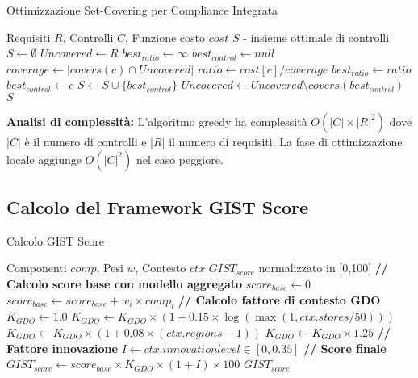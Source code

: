 \begin{algorithm}
\caption{Ottimizzazione Set-Covering per Compliance Integrata}
\label{alg:compliance}
\begin{algorithmic}
\Require Requisiti $R$, Controlli $C$, Funzione costo $cost$
\Ensure $S$ - insieme ottimale di controlli
\State $S \gets \emptyset$
\State $Uncovered \gets R$
    \State $best_{ratio} \gets \infty$
    \State $best_{control} \gets null$
        \State $coverage \gets |covers(c) \cap Uncovered|$
            \State $ratio \gets cost[c] / coverage$
                \State $best_{ratio} \gets ratio$
                \State $best_{control} \gets c$
            \EndIf
        \EndIf
    \EndFor
    \State $S \gets S \cup \{best_{control}\}$
    \State $Uncovered \gets Uncovered \setminus covers(best_{control})$
\EndWhile
\State \Return $S$
\end{algorithmic}
\end{algorithm}

\textbf{Analisi di complessità:} L'algoritmo greedy ha complessità $O(|C| \times |R|^2)$ dove $|C|$ è il numero di controlli e $|R|$ il numero di requisiti. La fase di ottimizzazione locale aggiunge $O(|C|^2)$ nel caso peggiore.

\subsection{\texorpdfstring{Calcolo del Framework GIST Score}{C.1.3 - Calcolo del Framework GIST Score}}

\begin{algorithm}
\caption{Calcolo GIST Score}
\label{alg:gist}
\begin{algorithmic}
\Require Componenti $comp$, Pesi $w$, Contesto $ctx$
\Ensure $GIST_{score}$ normalizzato in [0,100]
\State \textbf{// Calcolo score base con modello aggregato}
\State $score_{base} \gets 0$
    \State $score_{base} \gets score_{base} + w_i \times comp_i$
\EndFor
\State \textbf{// Calcolo fattore di contesto GDO}
\State $K_{GDO} \gets 1.0$
\State $K_{GDO} \gets K_{GDO} \times (1 + 0.15 \times \log(\max(1, ctx.stores/50)))$
\State $K_{GDO} \gets K_{GDO} \times (1 + 0.08 \times (ctx.regions - 1))$
\State $K_{GDO} \gets K_{GDO} \times 1.25$ 
\State \textbf{// Fattore innovazione}
\State $I \gets ctx.innovation\mathit{level} \in [0, 0.35]$
\State \textbf{// Score finale}
\State $GIST_{score} \gets score_{base} \times K_{GDO} \times (1 + I) \times 100$
\State \Return $GIST_{score}$
\end{algorithmic}
\end{algorithm}

